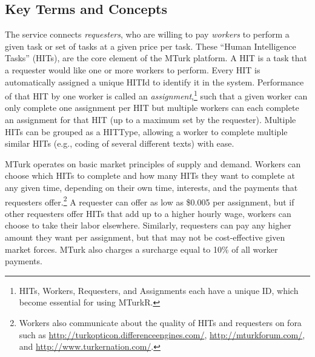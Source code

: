 \documentclass[11pt]{article}
\begin{document}
\subsection{Key Terms and Concepts}
The service connects \emph{requesters}, who are willing to pay \emph{workers} to perform a given task or set of tasks at a given price per task. These ``Human Intelligence Tasks'' (HITs), are the core element of the MTurk platform. A HIT is a task that a requester would like one or more workers to perform. Every HIT is automatically assigned a unique HITId to identify it in the system. Performance of that HIT by one worker is called an \emph{assignment},\footnote{HITs, Workers, Requesters, and Assignments each have a unique ID, which become essential for using MTurkR.} such that a given worker can only complete one assignment per HIT but multiple workers can each complete an assignment for that HIT (up to a maximum set by the requester). Multiple HITs can be grouped as a HITType, allowing a worker to complete multiple similar HITs (e.g., coding of several different texts) with ease.


MTurk operates on basic market principles of supply and demand. Workers can choose which HITs to complete and how many HITs they want to complete at any given time, depending on their own time, interests, and the payments that requesters offer.\footnote{Workers also communicate about the quality of HITs and requesters on fora such as \url{http://turkopticon.differenceengines.com/}, \url{http://mturkforum.com/}, and \url{http://www.turkernation.com/}.} A requester can offer as low as \$0.005 per assignment, but if other requesters offer HITs that add up to a higher hourly wage, workers can choose to take their labor elsewhere. Similarly, requesters can pay any higher amount they want per assignment, but that may not be cost-effective given market forces. MTurk also charges a surcharge equal to 10\% of all worker payments.
\end{document}
